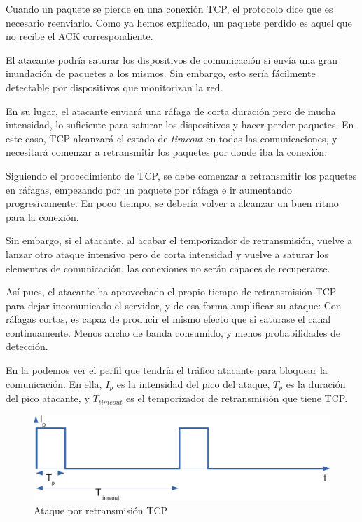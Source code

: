 Cuando un paquete se pierde en una conexión \gls{TCP}, el protocolo dice que es necesario reenviarlo. Como ya hemos 
explicado, un paquete perdido es aquel que no recibe el \gls{ACK} correspondiente.

El atacante podría saturar los dispositivos de comunicación si envía una gran inundación de paquetes a los mismos. Sin 
embargo, esto sería fácilmente detectable por dispositivos que monitorizan la red.

En su lugar, el atacante enviará una ráfaga de corta duración pero de mucha intensidad, lo suficiente para saturar los 
dispositivos y hacer perder paquetes. En este caso, \gls{TCP} alcanzará el estado de \emph{timeout} en todas las 
comunicaciones, y necesitará comenzar a retransmitir los paquetes por donde iba la conexión.

Siguiendo el procedimiento de \gls{TCP}, se debe comenzar a retransmitir los paquetes en ráfagas, empezando por un 
paquete por ráfaga e ir aumentando progresivamente. En poco tiempo, se debería volver a alcanzar un buen ritmo para la 
conexión.

Sin embargo, si el atacante, al acabar el temporizador de retransmisión, vuelve a lanzar otro ataque intensivo pero de 
corta intensidad y vuelve a saturar los elementos de comunicación, las conexiones no serán capaces de recuperarse.

Así pues, el atacante ha aprovechado el propio tiempo de retransmisión \gls{TCP} para dejar incomunicado el servidor, y 
de esa forma amplificar su ataque: Con ráfagas cortas, es capaz de producir el mismo efecto que si saturase el canal 
continuamente. Menos ancho de banda consumido, y menos probabilidades de detección.

En la  podemos ver el perfil que tendría el tráfico atacante para bloquear la comunicación. En ella, 
$I_p$ es la intensidad del pico del ataque, $T_p$ es la duración del pico atacante, y $T_{timeout}$ es el temporizador 
de retransmisión que tiene \gls{TCP}.

\begin{figure}[htbp]
\centering
\includegraphics[width=\textwidth]{CapituloDDoS/Figuras/RTO_attack}
\caption{Ataque por retransmisión TCP}
\end{figure}
%

